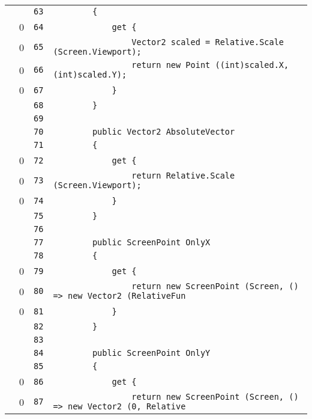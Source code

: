 \documentclass[a4paper,10pt]{article}
\begin{document}
\begin{longtable}[l]{lrrl}
\cellcolor{gray} &  & \verb~63~ & \verb~        {~\\
\cellcolor{red} & 0 & \verb~64~ & \verb~            get {~\\
\cellcolor{red} & 0 & \verb~65~ & \verb~                Vector2 scaled = Relative.Scale (Screen.Viewport);~\\
\cellcolor{red} & 0 & \verb~66~ & \verb~                return new Point ((int)scaled.X, (int)scaled.Y);~\\
\cellcolor{red} & 0 & \verb~67~ & \verb~            }~\\
\cellcolor{gray} &  & \verb~68~ & \verb~        }~\\
\cellcolor{gray} &  & \verb~69~ & \verb~~\\
\cellcolor{gray} &  & \verb~70~ & \verb~        public Vector2 AbsoluteVector~\\
\cellcolor{gray} &  & \verb~71~ & \verb~        {~\\
\cellcolor{red} & 0 & \verb~72~ & \verb~            get {~\\
\cellcolor{red} & 0 & \verb~73~ & \verb~                return Relative.Scale (Screen.Viewport);~\\
\cellcolor{red} & 0 & \verb~74~ & \verb~            }~\\
\cellcolor{gray} &  & \verb~75~ & \verb~        }~\\
\cellcolor{gray} &  & \verb~76~ & \verb~~\\
\cellcolor{gray} &  & \verb~77~ & \verb~        public ScreenPoint OnlyX~\\
\cellcolor{gray} &  & \verb~78~ & \verb~        {~\\
\cellcolor{red} & 0 & \verb~79~ & \verb~            get {~\\
\cellcolor{red} & 0 & \verb~80~ & \verb~                return new ScreenPoint (Screen, () => new Vector2 (RelativeFun~\\
\cellcolor{red} & 0 & \verb~81~ & \verb~            }~\\
\cellcolor{gray} &  & \verb~82~ & \verb~        }~\\
\cellcolor{gray} &  & \verb~83~ & \verb~~\\
\cellcolor{gray} &  & \verb~84~ & \verb~        public ScreenPoint OnlyY~\\
\cellcolor{gray} &  & \verb~85~ & \verb~        {~\\
\cellcolor{red} & 0 & \verb~86~ & \verb~            get {~\\
\cellcolor{red} & 0 & \verb~87~ & \verb~                return new ScreenPoint (Screen, () => new Vector2 (0, Relative~\\

\end{longtable}
\end{document}
